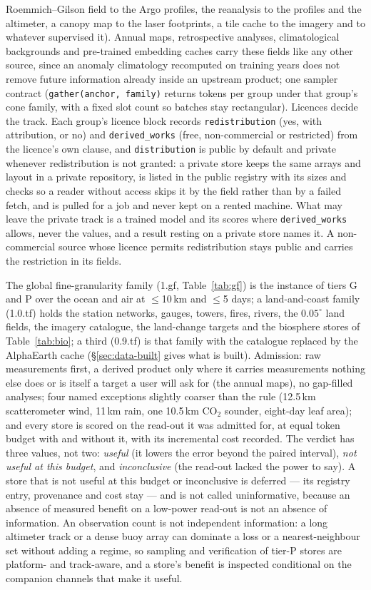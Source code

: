 \documentclass[10pt]{article}
\newcommand{\code}[1]{\texttt{#1}}
\begin{document}
Roemmich--Gilson field to the Argo profiles, the reanalysis to the profiles
and the altimeter, a canopy map to the laser footprints, a tile cache to the
imagery and to whatever supervised it). Annual maps, retrospective analyses,
climatological backgrounds and pre-trained embedding caches carry these
fields like any other source, since an anomaly climatology recomputed on
training years does not remove future information already inside an
upstream product; one sampler contract
(\code{gather(anchor, family)} returns tokens per group under that group's
cone family, with a fixed slot count so batches stay rectangular). Licences
decide the track. Each group's licence block records \code{redistribution}
(yes, with attribution, or no) and \code{derived\_works} (free,
non-commercial or restricted) from the licence's own clause, and
\code{distribution} is public by default and private whenever redistribution
is not granted: a private store keeps the same arrays and layout in a private
repository, is listed in the public registry with its sizes and checks so a
reader without access skips it by the field rather than by a failed fetch,
and is pulled for a job and never kept on a rented machine. What may leave the
private track is a trained model and its scores where \code{derived\_works}
allows, never the values, and a result resting on a private store names it. A
non-commercial source whose licence permits redistribution stays public and
carries the restriction in its fields.

The global fine-granularity family (1.gf, Table~\ref{tab:gf}) is the instance of
tiers G and P over the ocean and air at ${\le}$10\,km and ${\le}$5 days; a
land-and-coast family (1.0.tf) holds the station networks, gauges, towers, fires,
rivers, the $0.05^\circ$ land fields, the imagery catalogue, the
land-change targets and the biosphere stores of Table~\ref{tab:bio}; a
third (0.9.tf) is that family with the catalogue replaced by the AlphaEarth
cache (\S\ref{sec:data-built} gives what is built).
Admission: raw measurements first, a derived product only where it carries
measurements nothing else does or is itself a target a user will ask for
(the annual maps), no gap-filled analyses; four named exceptions slightly
coarser than the rule (12.5\,km scatterometer wind, 11\,km rain, one
10.5\,km CO$_2$ sounder, eight-day leaf area); and every store is scored on
the read-out it was admitted for, at equal token budget with and without it,
with its incremental cost recorded. The verdict has three values, not two:
\emph{useful} (it lowers the error beyond the paired interval), \emph{not
useful at this budget}, and \emph{inconclusive} (the read-out lacked the
power to say). A store that is not useful at this budget or inconclusive is
deferred --- its registry entry, provenance and cost stay --- and is not
called uninformative, because an absence of measured benefit on a low-power
read-out is not an absence of information. An observation count is not
independent information: a long altimeter track or a dense buoy array can
dominate a loss or a nearest-neighbour set without adding a regime, so
sampling and verification of tier-P stores are platform- and track-aware,
and a store's benefit is inspected conditional on the companion channels
that make it useful.
\end{document}
